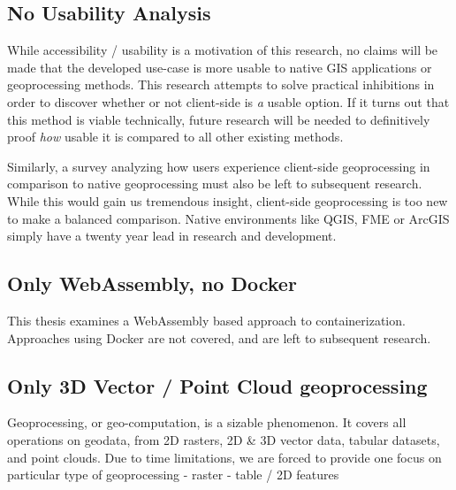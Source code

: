 \subsection*{ No Usability Analysis } %
While accessibility / usability is a motivation of this research, no claims will be made that the developed use-case is more usable to native GIS applications or geoprocessing methods. This research attempts to solve practical inhibitions in order to discover whether or not client-side is \emph{a} usable option. If it turns out that this method is viable technically, future research will be needed to definitively proof \emph{how} usable it is compared to all other existing methods.  


Similarly, a survey analyzing how users experience client-side geoprocessing in comparison to native geoprocessing must also be left to subsequent research. While this would gain us tremendous insight, client-side geoprocessing is too new to make a balanced comparison. Native environments like QGIS, FME or ArcGIS simply have a twenty year lead in research and development. 



\subsection {Only WebAssembly, no Docker}
This thesis examines a WebAssembly based approach to containerization. Approaches using Docker are not covered, and are left to subsequent research.

\subsection*{ Only 3D Vector / Point Cloud geoprocessing}
Geoprocessing, or geo-computation, is a sizable phenomenon. 
It covers all operations on geodata, from 2D rasters, 2D \& 3D vector data, tabular datasets, and point clouds. 
Due to time limitations, we are forced to provide one focus on particular type of geoprocessing
- raster
- table / 2D features

